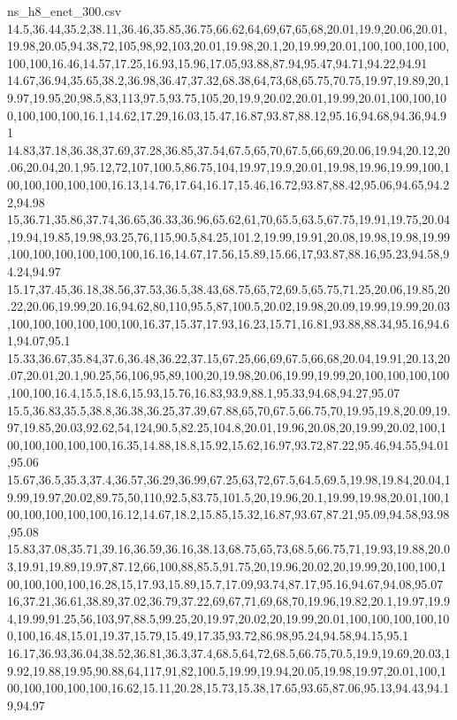 \begin{filecontents*}[overwrite]{ns_h8_enet_300.csv}
14.5,36.44,35.2,38.11,36.46,35.85,36.75,66.62,64,69,67,65,68,20.01,19.9,20.06,20.01,19.98,20.05,94.38,72,105,98,92,103,20.01,19.98,20.1,20,19.99,20.01,100,100,100,100,100,100,16.46,14.57,17.25,16.93,15.96,17.05,93.88,87.94,95.47,94.71,94.22,94.91
14.67,36.94,35.65,38.2,36.98,36.47,37.32,68.38,64,73,68,65.75,70.75,19.97,19.89,20,19.97,19.95,20,98.5,83,113,97.5,93.75,105,20,19.9,20.02,20.01,19.99,20.01,100,100,100,100,100,100,16.1,14.62,17.29,16.03,15.47,16.87,93.87,88.12,95.16,94.68,94.36,94.91
14.83,37.18,36.38,37.69,37.28,36.85,37.54,67.5,65,70,67.5,66,69,20.06,19.94,20.12,20.06,20.04,20.1,95.12,72,107,100.5,86.75,104,19.97,19.9,20.01,19.98,19.96,19.99,100,100,100,100,100,100,16.13,14.76,17.64,16.17,15.46,16.72,93.87,88.42,95.06,94.65,94.22,94.98
15,36.71,35.86,37.74,36.65,36.33,36.96,65.62,61,70,65.5,63.5,67.75,19.91,19.75,20.04,19.94,19.85,19.98,93.25,76,115,90.5,84.25,101.2,19.99,19.91,20.08,19.98,19.98,19.99,100,100,100,100,100,100,16.16,14.67,17.56,15.89,15.66,17,93.87,88.16,95.23,94.58,94.24,94.97
15.17,37.45,36.18,38.56,37.53,36.5,38.43,68.75,65,72,69.5,65.75,71.25,20.06,19.85,20.22,20.06,19.99,20.16,94.62,80,110,95.5,87,100.5,20.02,19.98,20.09,19.99,19.99,20.03,100,100,100,100,100,100,16.37,15.37,17.93,16.23,15.71,16.81,93.88,88.34,95.16,94.61,94.07,95.1
15.33,36.67,35.84,37.6,36.48,36.22,37.15,67.25,66,69,67.5,66,68,20.04,19.91,20.13,20.07,20.01,20.1,90.25,56,106,95,89,100,20,19.98,20.06,19.99,19.99,20,100,100,100,100,100,100,16.4,15.5,18.6,15.93,15.76,16.83,93.9,88.1,95.33,94.68,94.27,95.07
15.5,36.83,35.5,38.8,36.38,36.25,37.39,67.88,65,70,67.5,66.75,70,19.95,19.8,20.09,19.97,19.85,20.03,92.62,54,124,90.5,82.25,104.8,20.01,19.96,20.08,20,19.99,20.02,100,100,100,100,100,100,16.35,14.88,18.8,15.92,15.62,16.97,93.72,87.22,95.46,94.55,94.01,95.06
15.67,36.5,35.3,37.4,36.57,36.29,36.99,67.25,63,72,67.5,64.5,69.5,19.98,19.84,20.04,19.99,19.97,20.02,89.75,50,110,92.5,83.75,101.5,20,19.96,20.1,19.99,19.98,20.01,100,100,100,100,100,100,16.12,14.67,18.2,15.85,15.32,16.87,93.67,87.21,95.09,94.58,93.98,95.08
15.83,37.08,35.71,39.16,36.59,36.16,38.13,68.75,65,73,68.5,66.75,71,19.93,19.88,20.03,19.91,19.89,19.97,87.12,66,100,88,85.5,91.75,20,19.96,20.02,20,19.99,20,100,100,100,100,100,100,16.28,15,17.93,15.89,15.7,17.09,93.74,87.17,95.16,94.67,94.08,95.07
16,37.21,36.61,38.89,37.02,36.79,37.22,69,67,71,69,68,70,19.96,19.82,20.1,19.97,19.94,19.99,91.25,56,103,97,88.5,99.25,20,19.97,20.02,20,19.99,20.01,100,100,100,100,100,100,16.48,15.01,19.37,15.79,15.49,17.35,93.72,86.98,95.24,94.58,94.15,95.1
16.17,36.93,36.04,38.52,36.81,36.3,37.4,68.5,64,72,68.5,66.75,70.5,19.9,19.69,20.03,19.92,19.88,19.95,90.88,64,117,91,82,100.5,19.99,19.94,20.05,19.98,19.97,20.01,100,100,100,100,100,100,16.62,15.11,20.28,15.73,15.38,17.65,93.65,87.06,95.13,94.43,94.19,94.97

\end{filecontents*}
